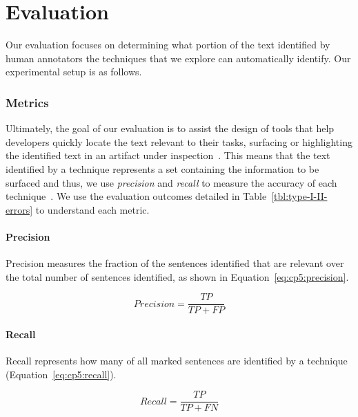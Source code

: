 \clearpage

\section{Evaluation}
\label{cp5:evaluation}


Our evaluation focuses 
on determining what portion of the text identified by human annotators the techniques that we explore can automatically identify.
Our experimental setup is as follows.



\subsubsection{Metrics}


Ultimately, the goal of our evaluation is to assist the design of tools that help developers quickly locate the text relevant to their tasks, surfacing or highlighting the identified text in an artifact under inspection~\cite{Robillard2015}.
This means that the text identified by a technique represents a set containing the information to be surfaced and thus, 
we use \textit{precision} and \textit{recall} to measure the accuracy of each technique~\cite{Manning2009IR}.
We use the evaluation outcomes detailed in Table~\ref{tbl:type-I-II-errors} to understand each metric.

\medskip




\paragraph{\textbf{Precision}}

Precision measures the fraction of the sentences identified that are relevant over the total number of sentences identified, as shown in Equation~\ref{eq:cp5:precision}.



\begin{equation}
\label{eq:cp5:precision}    
    Precision = \frac{TP}{TP + FP}
\end{equation}


\paragraph{\textbf{Recall}} Recall represents how many of all marked sentences are identified by a technique (Equation~\ref{eq:cp5:recall}).


\begin{equation}
\label{eq:cp5:recall}        
    Recall = \frac{TP}{TP + FN}
\end{equation}



